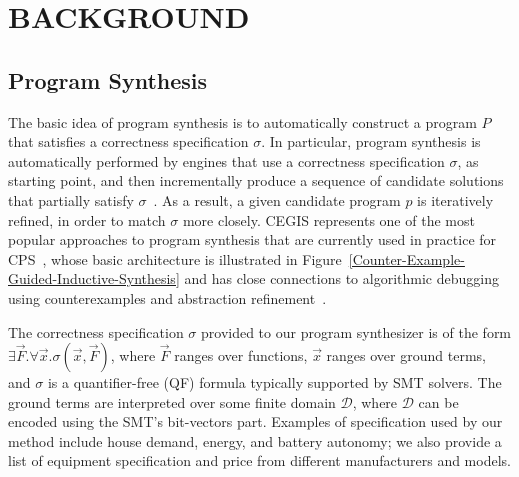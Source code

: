 \documentclass[review]{elsarticle}
\begin{document}
\section{BACKGROUND}
\label{sec:AutomatedVerification}
%
\subsection{Program Synthesis}
\label{sec:ProgramSynthesis}
%
The basic idea of program synthesis is to automatically construct a program $P$ that satisfies a correctness specification $\sigma$. In particular, program synthesis is automatically performed by engines that use a correctness specification $\sigma$, as starting point, and then incrementally produce a sequence of candidate solutions that partially satisfy $\sigma$~\cite{Abateetal2017}. As a result, a given candidate program $p$ is iteratively refined, in order to match $\sigma$ more closely. CEGIS represents one of the most popular approaches to program synthesis that are currently used in practice for CPS~\cite{Abateetal2017}, whose basic architecture is illustrated in Figure~\ref{Counter-Example-Guided-Inductive-Synthesis} and has close connections to algorithmic debugging using counterexamples and abstraction refinement~\cite{Alur13}. 

The correctness specification $\sigma$ provided to our program synthesizer is of the form $\exists \vec{F} .  \forall \vec{x}.  \sigma(\vec{x}, \vec{F})$, where $\vec{F}$ ranges over functions, $\vec{x}$ ranges over ground terms, and $\sigma$ is a quantifier-free (QF) formula typically supported by SMT solvers. The ground terms are interpreted over some finite domain $\mathcal{D}$, where $\mathcal{D}$ can be encoded using the SMT's bit-vectors part. Examples of specification used by our method include house demand, energy, and battery autonomy; we also provide a list of equipment specification and price from different manufacturers and models.
\end{document}
